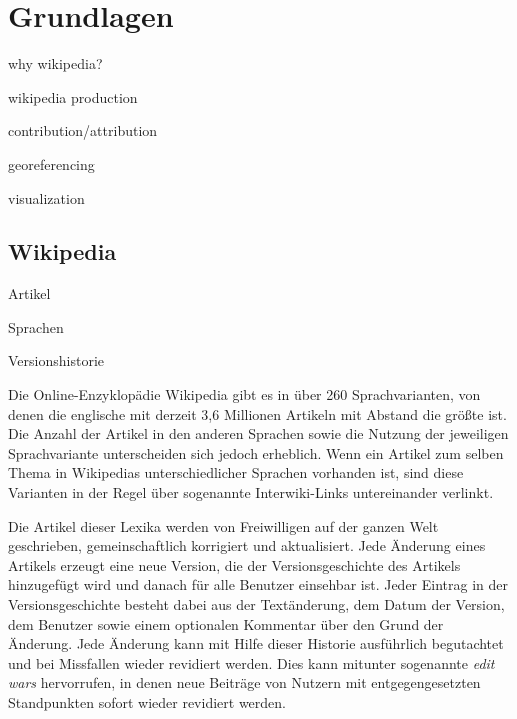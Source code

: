 \chapter{Grundlagen}\label{ch:foundation}

\begin{todos}
    \item {}
    \item why wikipedia?
    \item wikipedia production
    \item contribution/attribution
    \item georeferencing
    \item visualization
\end{todos}

\section{Wikipedia}


\begin{todos}
    \item Artikel
    \item Sprachen
    \item Versionshistorie
\end{todos}

Die Online-Enzyklopädie Wikipedia gibt es in über 260 Sprachvarianten, von denen die englische mit derzeit 3,6 Millionen Artikeln mit Abstand die größte ist.
Die Anzahl der Artikel in den anderen Sprachen sowie die Nutzung der jeweiligen Sprachvariante unterscheiden sich jedoch erheblich.\cite{wikistats}
Wenn ein Artikel zum selben Thema in Wikipedias unterschiedlicher Sprachen vorhanden ist, sind diese Varianten in der Regel über sogenannte Interwiki-Links untereinander verlinkt.

Die Artikel dieser Lexika werden von Freiwilligen auf der ganzen Welt geschrieben, gemeinschaftlich korrigiert und aktualisiert.
Jede Änderung eines Artikels erzeugt eine neue Version, die der Versionsgeschichte des Artikels hinzugefügt wird und danach für alle Benutzer einsehbar ist.
Jeder Eintrag in der Versionsgeschichte besteht dabei aus der Textänderung, dem Datum der Version, dem Benutzer sowie einem optionalen Kommentar über den Grund der Änderung.
Jede Änderung kann mit Hilfe dieser Historie ausführlich begutachtet und bei Missfallen wieder revidiert werden. 
Dies kann mitunter sogenannte \emph{edit wars} hervorrufen, in denen neue Beiträge von Nutzern mit entgegengesetzten Standpunkten sofort wieder revidiert werden.\cite{suh2007us} 

